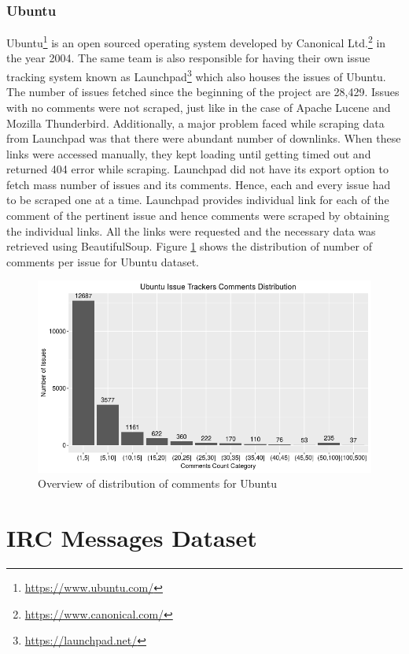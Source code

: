 \documentclass[a4paper,12pt,twoside]{report}
\begin{document}
\subsubsection{Ubuntu}
Ubuntu\footnote{\url{https://www.ubuntu.com/}} is an open sourced operating system developed by Canonical Ltd.\footnote{\url{https://www.canonical.com/}} in the year 2004. The same team is also responsible for having their own issue tracking system known as Launchpad\footnote{\url{https://launchpad.net/}} which also houses the issues of Ubuntu. The number of issues fetched since the beginning of the project are 28,429. Issues with no comments were not scraped, just like in the case of Apache Lucene and Mozilla Thunderbird. Additionally, a major problem faced while scraping data from Launchpad was that there were abundant number of downlinks. When these links were accessed manually, they kept loading until getting timed out and returned 404 error while scraping.
\newline
Launchpad did not have its export option to fetch mass number of issues and its comments. Hence, each and every issue had to be scraped one at a time. Launchpad provides individual link for each of the comment of the pertinent issue and hence comments were scraped by obtaining the individual links. All the links were requested and the necessary data was retrieved using BeautifulSoup. Figure \ref{fig:ubuntuRawDistro} shows the distribution of number of comments per issue for Ubuntu dataset. 

\begin{figure}[h] %
    \centering
    \includegraphics[width=12cm]{ubuntu-comment-distribution-raw}
    \caption{Overview of distribution of comments for Ubuntu}
    \label{fig:ubuntuRawDistro}
\end{figure}


\section{IRC Messages Dataset}
\end{document}
